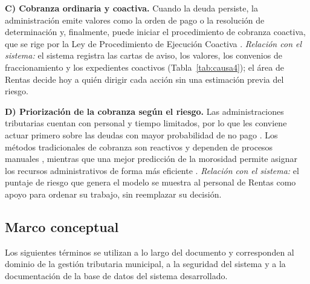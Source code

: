 \documentclass[12pt,a4paper]{report}
\begin{document}
\noindent\textbf{C) Cobranza ordinaria y coactiva.} Cuando la deuda persiste, la administración emite valores como la orden de pago o la resolución de determinación y, finalmente, puede iniciar el procedimiento de cobranza coactiva, que se rige por la Ley de Procedimiento de Ejecución Coactiva \parencite{ley26979}. \textit{Relación con el sistema:} el sistema registra las cartas de aviso, los valores, los convenios de fraccionamiento y los expedientes coactivos (Tabla~\ref{tab:causa4}); el área de Rentas decide hoy a quién dirigir cada acción sin una estimación previa del riesgo.

\noindent\textbf{D) Priorización de la cobranza según el riesgo.} Las administraciones tributarias cuentan con personal y tiempo limitados, por lo que les conviene actuar primero sobre las deudas con mayor probabilidad de no pago \parencite{ordonez2020}. Los métodos tradicionales de cobranza son reactivos y dependen de procesos manuales \parencite{benedetto2026}, mientras que una mejor predicción de la morosidad permite asignar los recursos administrativos de forma más eficiente \parencite{leekim2024}. \textit{Relación con el sistema:} el puntaje de riesgo que genera el modelo se muestra al personal de Rentas como apoyo para ordenar su trabajo, sin reemplazar su decisión.

\subsection{Marco conceptual}

Los siguientes términos se utilizan a lo largo del documento y corresponden al dominio de la gestión tributaria municipal, a la seguridad del sistema y a la documentación de la base de datos del sistema desarrollado.
\end{document}
